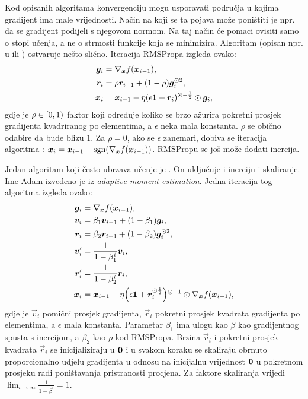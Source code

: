 \documentclass[utf8, diplomski, lmodern]{fer}
\begin{document}
Kod opisanih algoritama konvergenciju mogu usporavati područja u kojima gradijent ima male vrijednosti. Način na koji se ta pojava može poništiti je npr. da se gradijent podijeli s njegovom normom. Na taj način će pomaci ovisiti samo o stopi učenja, a ne o strmosti funkcije koja se minimizira. Algoritam  (opisan npr. u \citet{Hinton:2012:NNMLLOMBG} ili \citet{Ruder:2016:OGDOA}) ostvaruje nešto slično. Iteracija RMSPropa izgleda ovako:
\begin{align}
\vec g_i &= \nabla_{\vec x}f(\vec x_{i-1}), \\
\vec r_i &= \rho\vec r_{i-1} + (1-\rho)\vec g_i^{\odot 2}, \\
\vec x_i &= \vec x_{i-1} - \eta\del{\epsilon\cvec 1+\vec r_i}^{\odot-\frac{1}{2}} \odot \vec g_i \text{,}
\end{align}
gdje je $\rho\in\intco{0,1}$ faktor koji određuje koliko se brzo ažurira pokretni prosjek gradijenta kvadriranog po elementima, a $\epsilon$ neka mala konstanta. $\rho$ se obično odabire da bude blizu $1$. Za $\rho=0$, ako se $\epsilon$ zanemari, dobiva se iteracija algoritma  \citep{Hinton:2012:NNMLLOMBG}: $\vec x_i = \vec x_{i-1} - \sgn\del{\nabla_{\vec x}f(\vec x_{i-1})}$. RMSPropu se još može dodati inercija.

Jedan algoritam koji često ubrzava učenje je  \citep{Kingma:2014:AMSO}. On uključuje i inerciju i skaliranje. Ime Adam izvedeno je iz \textit{adaptive moment estimation}. Jedna iteracija tog algoritma izgleda ovako:
\begin{align}
\vec g_i &= \nabla_{\vec x}f(\vec x_{i-1}), \\
\vec v_i &= \beta_1\vec v_{i-1} + (1-\beta_1)\vec g_i, \\
\vec r_i &= \beta_2\vec r_{i-1} + (1-\beta_2)\vec g_i^{\odot 2}, \\
\vec v'_i &= \frac{1}{1-\beta_1^i}\vec v_i, \\
\vec r'_i &= \frac{1}{1-\beta_2^i}\vec r_i, \\
\vec x_i &= \vec x_{i-1} - \eta\del{\epsilon\cvec 1+\vec r_i^{\odot\frac{1}{2}}}^{\odot-1} \odot \nabla_{\vec x}f(\vec x_{i-1}) \text{,}
\end{align}
gdje je $\vec v_i$ pomični prosjek gradijenta, $\vec r_i$ pokretni prosjek kvadrata gradijenta po elementima, a $\epsilon$ mala konstanta. Parametar $\beta_1$ ima ulogu kao $\beta$ kao gradijentnog spusta s inercijom, a $\beta_2$ kao $\rho$ kod RMSPropa. Brzina $\vec v_i$ i pokretni prosjek kvadrata $\vec r_i$ se inicijaliziraju u $\mathbf{0}$ i u svakom koraku se skaliraju obrnuto proporcionalno udjelu gradijenta u odnosu na inicijalnu vrijednost $\mathbf{0}$ u pokretnom prosjeku radi poništavanja pristranosti procjena. Za faktore skaliranja vrijedi $\lim_{i\to\infty}\frac{1}{1-\beta^i}=1$.
\end{document}
